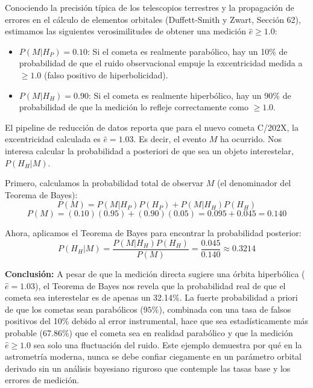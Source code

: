 Conociendo la precisión típica de los telescopios terrestres y la propagación de errores en el cálculo de elementos orbitales (Duffett-Smith y Zwart, Sección 62), estimamos las siguientes verosimilitudes de obtener una medición $\hat{e} \ge 1.0$:
\begin{itemize}
    \item $P(M | H_P) = 0.10$: Si el cometa es realmente parabólico, hay un 10\% de probabilidad de que el ruido observacional empuje la excentricidad medida a $\ge 1.0$ (falso positivo de hiperbolicidad).
    \item $P(M | H_H) = 0.90$: Si el cometa es realmente hiperbólico, hay un 90\% de probabilidad de que la medición lo refleje correctamente como $\ge 1.0$.
\end{itemize}

El pipeline de reducción de datos reporta que para el nuevo cometa C/202X, la excentricidad calculada es $\hat{e} = 1.03$. Es decir, el evento $M$ ha ocurrido. Nos interesa calcular la probabilidad a posteriori de que sea un objeto interestelar, $P(H_H | M)$.

Primero, calculamos la probabilidad total de observar $M$ (el denominador del Teorema de Bayes):
$$ P(M) = P(M | H_P)P(H_P) + P(M | H_H)P(H_H) $$
$$ P(M) = (0.10)(0.95) + (0.90)(0.05) = 0.095 + 0.045 = 0.140 $$

Ahora, aplicamos el Teorema de Bayes para encontrar la probabilidad posterior:
$$ P(H_H | M) = \frac{P(M | H_H) P(H_H)}{P(M)} = \frac{0.045}{0.140} \approx 0.3214 $$

\textbf{Conclusión:} 
A pesar de que la medición directa sugiere una órbita hiperbólica ($\hat{e} = 1.03$), el Teorema de Bayes nos revela que la probabilidad real de que el cometa sea interestelar es de apenas un 32.14\%. La fuerte probabilidad a priori de que los cometas sean parabólicos ($95\%$), combinada con una tasa de falsos positivos del 10\% debido al error instrumental, hace que sea estadísticamente más probable (67.86\%) que el cometa sea en realidad parabólico y que la medición $\hat{e} \ge 1.0$ sea solo una fluctuación del ruido. Este ejemplo demuestra por qué en la astrometría moderna, nunca se debe confiar ciegamente en un parámetro orbital derivado sin un análisis bayesiano riguroso que contemple las tasas base y los errores de medición.